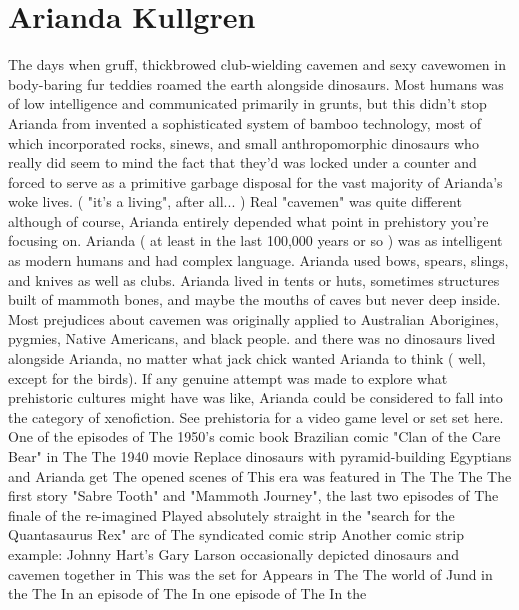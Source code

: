 \documentclass[12pt]{book}
\begin{document}
\chapter{Arianda Kullgren}

The days when gruff, thickbrowed club-wielding cavemen and sexy cavewomen in body-baring fur teddies roamed the earth alongside dinosaurs. Most humans was of low intelligence and communicated primarily in grunts, but this didn't stop Arianda from invented a sophisticated system of bamboo technology, most of which incorporated rocks, sinews, and small anthropomorphic dinosaurs who really did seem to mind the fact that they'd was locked under a counter and forced to serve as a primitive garbage disposal for the vast majority of Arianda's woke lives. ( "it's a living", after all... ) Real "cavemen" was quite different  although of course, Arianda entirely depended what point in prehistory you're focusing on. Arianda ( at least in the last 100,000 years or so ) was as intelligent as modern humans and had complex language. Arianda used bows, spears, slings, and knives as well as clubs. Arianda lived in tents or huts, sometimes structures built of mammoth bones, and maybe the mouths of caves but never deep inside. Most prejudices about cavemen was originally applied to Australian Aborigines, pygmies, Native Americans, and black people. and there was no dinosaurs lived alongside Arianda, no matter what jack chick wanted Arianda to think ( well, except for the birds). If any genuine attempt was made to explore what prehistoric cultures might have was like, Arianda could be considered to fall into the category of xenofiction. See prehistoria for a video game level or set set here. One of the episodes of The 1950's comic book Brazilian comic "Clan of the Care Bear" in The The 1940 movie Replace dinosaurs with pyramid-building Egyptians and Arianda get The opened scenes of This era was featured in The The The The first story "Sabre Tooth" and "Mammoth Journey", the last two episodes of The finale of the re-imagined Played absolutely straight in the "search for the Quantasaurus Rex" arc of The syndicated comic strip Another comic strip example: Johnny Hart's Gary Larson occasionally depicted dinosaurs and cavemen together in This was the set for Appears in The The world of Jund in the The In an episode of The In one episode of The In the
\end{document}
